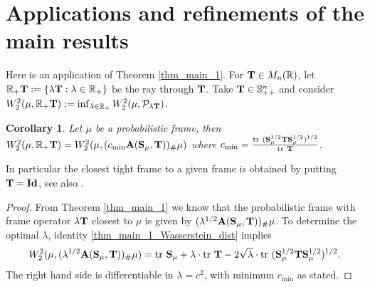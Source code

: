\documentclass{amsart}
\numberwithin{equation}{section}
\newcommand\cP{{\mathcal P}}
\newcommand\bS{{\bf S}}
\newcommand\bT{{\bf T}}
\newcommand\R{{\mathbb R}}
\newcommand\id{{\operatorname{\bf Id}}}
\renewcommand\min{{\operatorname{min}}}
\newcommand\tr{{\operatorname{tr}}}
\theoremstyle{plain}
\newtheorem{corollary}[subsection]{Corollary}
\theoremstyle{definition}
\begin{document}
\section{Applications and refinements of the main results}
Here is an application of Theorem \ref{thm_main_1}. 
For $\bT \in M_n(\R)$, let  $\R_+ \bT:=\{\lambda \bT: \lambda \in \R_+ \}$ be the ray through $\bT$. Take $\bT \in \mathbb{S}^n_{++}$ and consider $W^2_2(\mu,\R_+{\bf T} ):=\inf_{\lambda \in \R_+} W^2_2(\mu,\cP_{\lambda \bT} )$. %
\begin{corollary}
    Let $\mu$ be a probabilistic frame, then \\
    $W^2_2(\mu,\R_+{\bT} )=W^2_2(\mu, (c_{\min}  {\bf A}(\bS_{\mu}, \bT))_{\#}\mu)$   
    where  $c_{\min}=\frac{\tr \ (\bS^{1/2}_{\mu} \bT\bS^{1/2}_{\mu})^{1/2}}{\tr\ \bT} $. 
\end{corollary}
In particular the closest tight frame to a given frame is obtained by putting $\bT=\id $, see also \cite{loukili2020minimization}.     
\begin{proof}
From Theorem \ref{thm_main_1} we know that the probabilistic frame with frame operator $\lambda \bT$ closest to $\mu$ is given by $(\lambda^{1/2}  {\bf A}(\bS_{\mu}, \bT) )_{\#}\mu$. To determine the optimal $\lambda$, identity \ref{thm_main_1_Wasserstein_dist} implies    
\[W^2_2(\mu, (\lambda^{1/2}  {\bf A}(\bS_{\mu}, \bT))_{\#}\mu )=\tr\  \bS_{\mu} +\lambda \cdot \tr\ \bT -2 \sqrt{\lambda}\cdot \tr\ (\bS^{1/2}_{\mu}\bT \bS^{1/2}_{\mu})^{1/2}. \]
The right hand side is differentiable in $\lambda=c^2$, with minimum $c_{\min}$ as stated. 
\end{proof}
\end{document}

